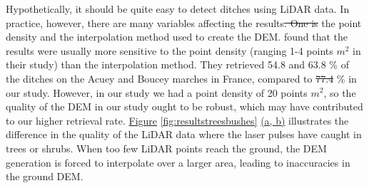 \documentclass[]{interact}
\theoremstyle{plain}%
\theoremstyle{definition}
\theoremstyle{remark}
\providecommand{\DIFaddtex}[1]{{\protect\color{blue}\uwave{#1}}} %
\providecommand{\DIFdeltex}[1]{{\protect\color{red}\sout{#1}}}                      %
\providecommand{\DIFaddbegin}{} %
\providecommand{\DIFaddend}{} %
\providecommand{\DIFdelbegin}{} %
\providecommand{\DIFdelend}{} %
\providecommand{\DIFadd}[1]{\texorpdfstring{\DIFaddtex{#1}}{#1}} %
\providecommand{\DIFdel}[1]{\texorpdfstring{\DIFdeltex{#1}}{}} %
\begin{document}
Hypothetically, it should be quite easy to detect ditches using LiDAR data. In practice, however, there are many variables affecting the results\DIFdelbegin \DIFdel{. One is }\DIFdelend \DIFaddbegin \DIFadd{, such as }\DIFaddend the point density and the interpolation method used to create the DEM. \citet{rapinel} found that the results were usually more sensitive to the point density (ranging 1-4 points $m^{2}$ in their study) than the interpolation method. They retrieved 54.8 and 63.8 \% of the ditches on the Acuey and Boucey marches in France, compared to \DIFdelbegin \DIFdel{77.4 }\DIFdelend \DIFaddbegin \DIFadd{70.28 }\DIFaddend \% in our study. However, in our study we had a point density of 20 points $m^{2}$, so the quality of the DEM in our study ought to be robust, which may have contributed to our higher retrieval rate. \hyperref[fig:resultstreesbushes]{Figure} \ref{fig:resultstreesbushes} \hyperref[fig:resultstreesbushes]{(a, b)} illustrates the difference in the quality of the LiDAR data where the laser pulses have caught in trees or shrubs. When too few LiDAR points reach the ground, the DEM generation is forced to interpolate over a larger area, leading to inaccuracies in the ground DEM.
\end{document}
